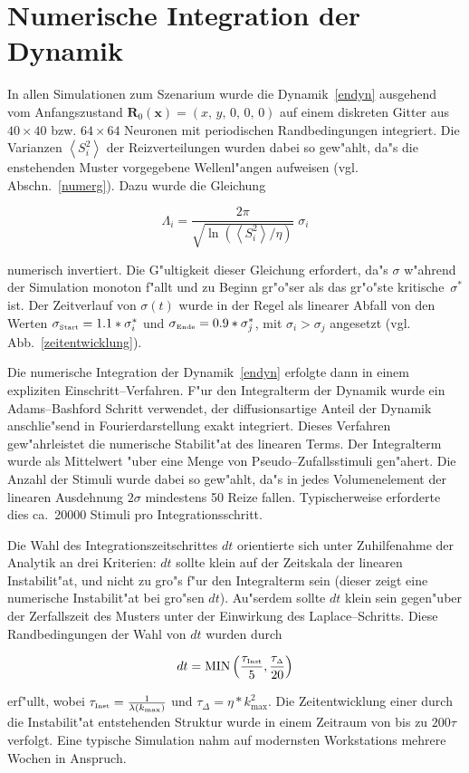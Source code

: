 \section{Numerische Integration der Dynamik}
\label{anhang2}
\thispagestyle{plain}

In allen Simulationen zum Szenarium wurde die Dynamik~\eqref{endyn}
ausgehend vom Anfangszustand $\mathbf{R}_0(\mathbf{x}) = (x,\, y,\, 0,\,
0,\, 0) $ auf einem diskreten Gitter aus $40\times 40$ bzw. $64\times 64$
Neuronen mit periodischen Randbedingungen integriert.  Die Varianzen
$\left<S_i^2\right>$ der Reizverteilungen wurden dabei so gew"ahlt, da"s
die enstehenden Muster vorgegebene Wellenl"angen aufweisen
(vgl. Abschn.~\ref{numerg}). Dazu wurde die Gleichung

\begin{equation*}
\Lambda_i = \frac{2 \pi}{\sqrt{\ln\left(\left<S_i^2\right>/\eta\right)}}\;\sigma_i
\end{equation*}

\noindent numerisch invertiert.  Die G"ultigkeit dieser Gleichung
erfordert, da"s $\sigma$ w"ahrend der Simulation monoton f"allt und zu
Beginn gr"o"ser als das gr"o"ste kritische~$\sigma^\ast$ ist.  Der
Zeitverlauf von $\sigma(t)$ wurde in der Regel als linearer Abfall von den
Werten $\sigma_{\mbox{\tiny Start}}=1.1*\sigma_i^\ast$ und
$\sigma_{\mbox{\tiny Ende}}=0.9*\sigma_j^\ast$, mit
$\sigma_i>\sigma_j$ angesetzt (vgl. Abb.~\ref{zeitentwicklung}).

Die numerische Integration der Dynamik~\eqref{endyn} erfolgte dann in einem
expliziten Einschritt--Verfahren. F"ur den Integralterm der Dynamik wurde
ein Adams--Bashford Schritt verwendet, der diffusionsartige Anteil der
Dynamik anschlie"send in Fourierdarstellung exakt integriert.  Dieses
Verfahren gew"ahrleistet die numerische Stabilit"at des linearen Terms.
Der Integralterm wurde als Mittelwert "uber eine Menge von
Pseudo--Zufallsstimuli gen"ahert. Die Anzahl der Stimuli wurde dabei so
gew"ahlt, da"s in jedes Volumenelement der linearen Ausdehnung $2\sigma$
mindestens 50 Reize fallen. Typischerweise erforderte dies ca.~20000
Stimuli pro Integrationsschritt.

Die Wahl des Integrationszeitschrittes $dt$ orientierte sich unter
Zuhilfenahme der Analytik an drei Kriterien: $dt$ sollte klein auf der
Zeitskala der linearen Instabilit"at, und nicht zu gro"s f"ur den
Integralterm sein (dieser zeigt eine numerische Instabilit"at bei gro"sen
$dt$). Au"serdem sollte $dt$ klein sein gegen"uber der Zerfallszeit des
Musters unter der Einwirkung des Laplace--Schritts.  Diese Randbedingungen
der Wahl von $dt$ wurden durch

\begin{equation*}
dt = \text{MIN}\left(\frac{\tau_{\mbox{\tiny
Inst}}}{5},\frac{\tau_{\scriptscriptstyle \Delta}}{20}\right)
\end{equation*}

\noindent erf"ullt, wobei $\tau_{\mbox{\tiny
Inst}}=\frac{1}{\lambda(k_{\text{max}})}$ und $\tau_{\scriptscriptstyle
\Delta}=\eta*k_{\text{max}}^2$.  Die Zeitentwicklung einer durch die
Instabilit"at entstehenden Struktur wurde in einem Zeitraum von bis zu
$200\tau$ verfolgt. Eine typische Simulation nahm auf modernsten
Workstations mehrere Wochen in Anspruch.
